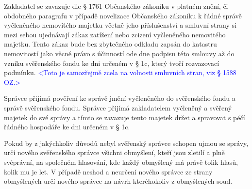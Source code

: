 \documentclass[parskip=half]{scrreprt}
\begin{document}
\begin{contract}


Zakladatel se zavazuje dle § 1761 Občanského zákoníku v platném znění, či obdobného paragrafu v případě novelizace Občanského zákoníku k řádné správě vyčleněného nemovitého majetku včetně jeho příslušenství a smluvní strany si mezi sebou ujednávají zákaz zatížení nebo zcizení vyčleněného nemovitého majetku. Tento zákaz bude bez zbytečného odkladu zapsán do katastru nemovitostí jako věcné právo s účinností ode dne podpisu této smlouvy až do vzniku svěřenského fondu ke dni určeném v § 1c, který tvoří rozvazovací podmínku. \textcolor{blue}{<Toto je samozřejmě zcela na volnosti smluvních stran, viz § 1588 OZ.>}



Správce přijímá pověření ke správě jmění vyčleněného do svěřenského fondu a správě svěřenského fondu. Správce přijímá zakladatelem vyčleněný a svěřený majetek do své správy a tímto se zavazuje tento majetek držet a spravovat s péčí řádného hospodáře ke dni určeném v § 1c.

Pokud by z jakýchkoliv důvodů nebyl svěřenský správce schopen ujmou se správy, určí nového svěřenského správce všichni obmyšlení, kteří jsou zletilí a plně svéprávní, na společném hlasování, kde každý obmyšlený má právě tolik hlasů, kolik mu je let. V případě neshod a neurčení nového správce ze strany obmyšlených určí nového správce na návrh kteréhokoliv z obmyšlených soud.


\end{contract}
\end{document}
